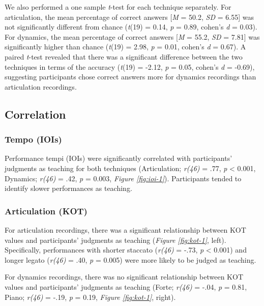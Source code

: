 \documentclass[
  man,floatsintext]{apa6}
\begin{document}
We also performed a one sample \emph{t}-test for each technique separately. For articulation, the mean percentage of correct answers {[}\emph{M} = 50.2, \emph{SD} = 6.55{]} was not significantly different from chance (\emph{t}(19) = 0.14, \emph{p} = 0.89, cohen's \emph{d} = 0.03). For dynamics, the mean percentage of correct answers {[}\emph{M} = 55.2, \emph{SD} = 7.81{]} was significantly higher than chance (\emph{t}(19) = 2.98, \emph{p} = 0.01, cohen's \emph{d} = 0.67). A paired \emph{t}-test revealed that there was a significant difference between the two techniques in terms of the accuracy (\emph{t}(19) = -2.12, \emph{p} = 0.05, cohen's \emph{d} = -0.69), suggesting participants chose correct answers more for dynamics recordings than articulation recordings.

\hypertarget{correlation}{%
\subsection{Correlation}\label{correlation}}

\hypertarget{tempo-iois}{%
\subsubsection{Tempo (IOIs)}\label{tempo-iois}}

Performance tempi (IOIs) were significantly correlated with participants' judgments as teaching for both techniques (Articulation; \emph{r(46)} = .77, \emph{p} \textless{} 0.001, Dynamics; \emph{r(46)} = .42, \emph{p} = 0.003, \emph{Figure \ref{fig:ioi-1}}). Participants tended to identify slower performances as teaching.

\hypertarget{articulation-kot}{%
\subsubsection{Articulation (KOT)}\label{articulation-kot}}

For articulation recordings, there was a significant relationship between KOT values and participants' judgments as teaching (\emph{Figure \ref{fig:kot-1}}, left). Specifically, performances with shorter staccato (\emph{r(46)} = -.73, \emph{p} \textless{} 0.001) and longer legato (\emph{r(46)} = .40, \emph{p} = 0.005) were more likely to be judged as teaching.

For dynamics recordings, there was no significant relationship between KOT values and participants' judgments as teaching (Forte; \emph{r(46)} = -.04, \emph{p} = 0.81, Piano; \emph{r(46)} = -.19, \emph{p} = 0.19, \emph{Figure \ref{fig:kot-1}}, right).
\end{document}
